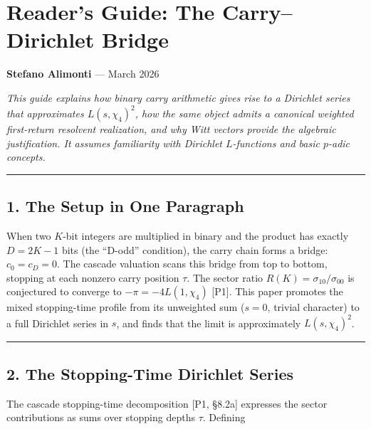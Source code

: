 \documentclass[
  11pt,
]{article}
\author{Stefano Alimonti --- stefalimonti@gmail.com}
\date{March 2026}
\begin{document}
{
\hypersetup{linkcolor=black}
\setcounter{tocdepth}{2}
\tableofcontents
}
\section{Reader's Guide: The Carry--Dirichlet
Bridge}\label{readers-guide-the-carrydirichlet-bridge}

\textbf{Stefano Alimonti} --- March 2026

\emph{This guide explains how binary carry arithmetic gives rise to a Dirichlet
series that approximates \(L(s, \chi_4)^2\), how the same object admits a
canonical weighted first-return resolvent realization, and why Witt vectors
provide the algebraic justification. It assumes familiarity with Dirichlet
\(L\)-functions and basic \(p\)-adic concepts.}

\begin{center}\rule{0.5\linewidth}{0.5pt}\end{center}

\newpage

\subsection{1. The Setup in One Paragraph}\label{the-setup-in-one-paragraph}

When two \(K\)-bit integers are multiplied in binary and the product has exactly
\(D = 2K - 1\) bits (the ``D-odd'' condition), the carry chain forms a bridge:
\(c_0 = c_D = 0\). The cascade valuation scans this bridge from top to bottom,
stopping at each nonzero carry position \(\tau\). The sector ratio
\(R(K) = \sigma_{10}/\sigma_{00}\) is conjectured to converge to
\(-\pi = -4L(1, \chi_4)\) {[}P1{]}. This paper promotes the mixed stopping-time
profile from its unweighted sum (\(s = 0\), trivial character) to a full
Dirichlet series in \(s\), and finds that the limit is approximately
\(L(s, \chi_4)^2\).

\begin{center}\rule{0.5\linewidth}{0.5pt}\end{center}

\newpage

\subsection{2. The Stopping-Time Dirichlet
Series}\label{the-stopping-time-dirichlet-series}

The cascade stopping-time decomposition {[}P1, §8.2a{]} expresses the sector
contributions as sums over stopping depths \(\tau\). Defining
\end{document}
